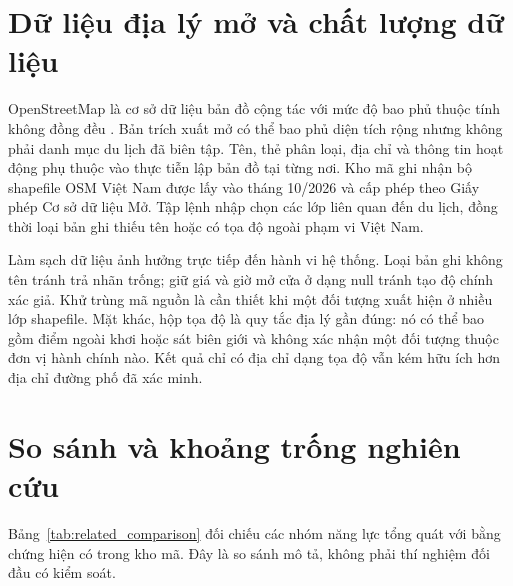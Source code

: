 \section{Dữ liệu địa lý mở và chất lượng dữ liệu}

OpenStreetMap là cơ sở dữ liệu bản đồ cộng tác với mức độ bao phủ thuộc tính không đồng đều \cite{haklay2008openstreetmap}. Bản trích xuất mở có thể bao phủ diện tích rộng nhưng không phải danh mục du lịch đã biên tập. Tên, thẻ phân loại, địa chỉ và thông tin hoạt động phụ thuộc vào thực tiễn lập bản đồ tại từng nơi. Kho mã ghi nhận bộ shapefile OSM Việt Nam được lấy vào tháng 10/2026 và cấp phép theo Giấy phép Cơ sở dữ liệu Mở. Tập lệnh nhập chọn các lớp liên quan đến du lịch, đồng thời loại bản ghi thiếu tên hoặc có tọa độ ngoài phạm vi Việt Nam.

Làm sạch dữ liệu ảnh hưởng trực tiếp đến hành vi hệ thống. Loại bản ghi không tên tránh trả nhãn trống; giữ giá và giờ mở cửa ở dạng null tránh tạo độ chính xác giả. Khử trùng mã nguồn là cần thiết khi một đối tượng xuất hiện ở nhiều lớp shapefile. Mặt khác, hộp tọa độ là quy tắc địa lý gần đúng: nó có thể bao gồm điểm ngoài khơi hoặc sát biên giới và không xác nhận một đối tượng thuộc đơn vị hành chính nào. Kết quả chỉ có địa chỉ dạng tọa độ vẫn kém hữu ích hơn địa chỉ đường phố đã xác minh.

\section{So sánh và khoảng trống nghiên cứu}

Bảng~\ref{tab:related_comparison} đối chiếu các nhóm năng lực tổng quát với bằng chứng hiện có trong kho mã. Đây là so sánh mô tả, không phải thí nghiệm đối đầu có kiểm soát.


